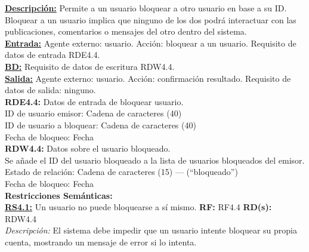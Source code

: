 \textbf{\textcolor{rojo}{\underline{Descripción:}}} Permite a un usuario bloquear a otro usuario en base a su ID. Bloquear a un usuario implica que ninguno de los dos podrá interactuar con las publicaciones, comentarios o mensajes del otro dentro del sistema. \\[6pt]

\textbf{\textcolor{rojo}{\underline{Entrada:}}} Agente externo: usuario. Acción: bloquear a un usuario.
Requisito de datos de entrada \textcolor{azul}{RDE4.4}. \\[6pt]

\textbf{\textcolor{rojo}{\underline{BD:}}} Requisito de datos de escritura \textcolor{azul}{RDW4.4}.\\[6pt]

\textbf{\textcolor{rojo}{\underline{Salida:}}} Agente externo: usuario. Acción: confirmación resultado.
Requisito de datos de salida: ninguno.\\[12pt]


\textcolor{azul}{\textbf{RDE4.4:}} Datos de entrada de bloquear usuario. \\[4pt]
\hspace*{1cm} ID de usuario emisor: Cadena de caracteres (40)\\
\hspace*{1cm} ID de usuario a bloquear: Cadena de caracteres (40)\\
\hspace*{1cm} Fecha de bloqueo: Fecha\\[8pt]

\textcolor{azul}{\textbf{RDW4.4:}} Datos sobre el usuario bloqueado. \\[4pt]
\hspace*{1cm} Se añade el ID del usuario bloqueado a la lista de usuarios bloqueados del \hspace*{1cm} emisor.\\
\hspace*{1cm} Estado de relación: Cadena de caracteres (15) — (“bloqueado”)\\
\hspace*{1cm} Fecha de bloqueo: Fecha\\[8pt]

\textbf{\textcolor{verde}{Restricciones Semánticas:}} \\[6pt]

\textbf{\textcolor{verde}{\underline{RS4.1:}}} Un usuario no puede bloquearse a sí mismo. \textbf{RF:} RF4.4 \textbf{RD(s):} RDW4.4 \\ 
\hspace*{1cm} \textit{Descripción:} El sistema debe impedir que un usuario intente bloquear su propia cuenta, mostrando un mensaje de error si lo intenta. \\[4pt]

